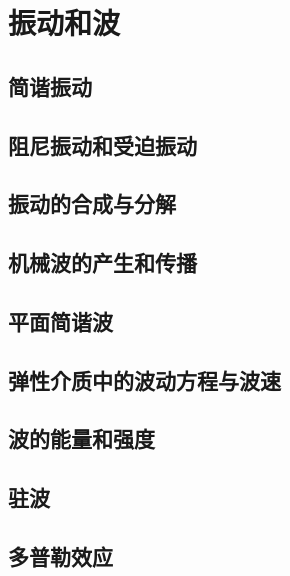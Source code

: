 \chapter{振动和波}
\section{简谐振动}
\section{阻尼振动和受迫振动}
\section{振动的合成与分解}
\section{机械波的产生和传播}
\section{平面简谐波}
\section{弹性介质中的波动方程与波速}
\section{波的能量和强度}
\section{驻波}
\section{多普勒效应}
